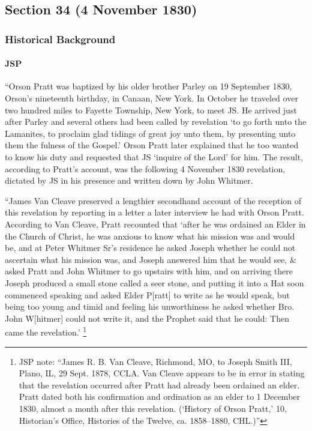\subsection{Section 34 (4 November 1830)}
	\label{DC34}
	
	\subsubsection{Historical Background}
		\label{DC34-HB}
		
		\paragraph{JSP}
		
			``Orson Pratt was baptized by his older brother Parley on 19 September 1830, Orson's nineteenth birthday, in Canaan, New York. In October he traveled over two hundred miles to Fayette Township, New York, to meet JS. He arrived just after Parley and several others had been called by revelation `to go forth unto the Lamanites, to proclaim glad tidings of great joy unto them, by presenting unto them the fulness of the Gospel.' Orson Pratt later explained that he too wanted to know his duty and requested that JS `inquire of the Lord' for him. The result, according to Pratt's account, was the following 4 November 1830 revelation, dictated by JS in his presence and written down by John Whitmer.
			
			``James Van Cleave preserved a lengthier secondhand account of the reception of this revelation by reporting in a letter a later interview he had with Orson Pratt. According to Van Cleave, Pratt recounted that `after he was ordained an Elder in the Church of Christ, he was anxious to know what his mission was and would be, and at Peter Whitmer Sr's residence he asked Joseph whether he could not ascertain what his mission was, and Joseph answered him that he would see, \& asked Pratt and John Whitmer to go upstairs with him, and on arriving there Joseph produced a small stone called a seer stone, and putting it into a Hat soon commenced speaking and asked Elder P[ratt] to write as he would speak, but being too young and timid and feeling his unworthiness he asked whether Bro. John W[hitmer] could not write it, and the Prophet said that he could: Then came the revelation.'%
				\footnote{%
					JSP note: ``James R. B. Van Cleave, Richmond, MO, to Joseph Smith III, Plano, IL, 29 Sept. 1878, CCLA. Van Cleave appears to be in error in stating that the revelation occurred after Pratt had already been ordained an elder. Pratt dated both his confirmation and ordination as an elder to 1 December 1830, almost a month after this revelation. (`History of Orson Pratt,' 10, Historian's Office, Histories of the Twelve, ca. 1858--1880, CHL.)''
					}
			
